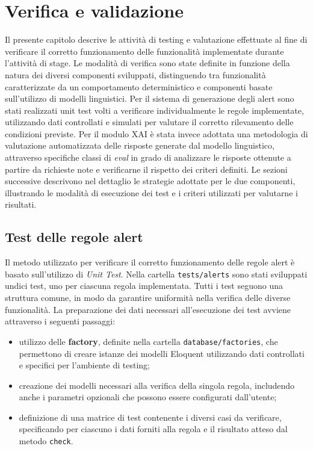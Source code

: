 \chapter{Verifica e validazione}
\label{chap:verifica-validazione}

Il presente capitolo descrive le attività di testing e valutazione effettuate al fine di verificare il corretto funzionamento delle funzionalità implementate 
durante l'attività di stage. Le modalità di verifica sono state definite in funzione della natura dei diversi componenti sviluppati, distinguendo tra funzionalità 
caratterizzate da un comportamento deterministico e componenti basate sull'utilizzo di modelli linguistici.
\newline
Per il sistema di generazione degli alert sono stati realizzati unit test volti a verificare individualmente le regole implementate, utilizzando dati controllati e simulati 
per valutare il corretto rilevamento delle condizioni previste. Per il modulo XAI è stata invece adottata una metodologia di valutazione automatizzata delle risposte generate 
dal modello linguistico, attraverso specifiche classi di \textit{eval} in grado di analizzare le risposte ottenute a partire da richieste note e verificarne il rispetto dei 
criteri definiti.
\newline
Le sezioni successive descrivono nel dettaglio le strategie adottate per le due componenti, illustrando le modalità di esecuzione dei test e i criteri utilizzati per valutarne 
i risultati.

\section{Test delle regole alert}
Il metodo utilizzato per verificare il corretto funzionamento delle regole alert è basato sull'utilizzo di \textit{Unit Test}. Nella cartella 
\texttt{tests/alerts} sono stati sviluppati undici test, uno per ciascuna regola implementata. Tutti i test seguono una struttura comune, in modo da garantire uniformità 
nella verifica delle diverse funzionalità.
\newline
La preparazione dei dati necessari all'esecuzione dei test avviene attraverso i seguenti passaggi:
\begin{itemize}
    \item utilizzo delle \textbf{factory}, definite nella cartella \texttt{database/factories}, che permettono di creare istanze dei modelli Eloquent utilizzando dati controllati e 
        specifici per l'ambiente di testing;
    \item creazione dei modelli necessari alla verifica della singola regola, includendo anche i parametri opzionali che possono essere configurati dall'utente;
    \item definizione di una matrice di test contenente i diversi casi da verificare, specificando per ciascuno i dati forniti alla regola e il risultato atteso dal metodo 
        \texttt{check}.
\end{itemize}

